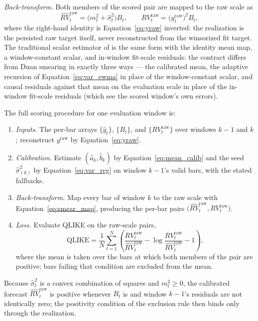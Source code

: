 \emph{Back-transform.} Both members of the scored pair are mapped to the
raw scale as
\begin{equation}
    \widehat{RV}_t^{\mathrm{raw}}
    = \bigl(m_t^2 + \hat{\sigma}^2_t\bigr) B_t,
    \qquad
    RV_t^{\mathrm{raw}} = \bigl(y^{\mathrm{raw}}_t\bigr)^2 B_t,
    \label{eq:smear_map}
\end{equation}
where the right-hand identity is Equation~\eqref{eq:yraw} inverted: the
realization is the persisted raw target itself, never reconstructed from
the winsorized fit target. The traditional scalar estimator of
\citet{Duan1983} is the same form with the identity mean map, a
window-constant scalar, and in-window fit-scale residuals: the contract
differs from Duan smearing in exactly three ways --- the calibrated
mean, the adaptive recursion of Equation~\eqref{eq:var_ewma} in place
of the window-constant scalar, and causal residuals against that mean
on the evaluation scale in place of the in-window fit-scale residuals
(which see the scored window's own errors).

The full scoring procedure for one evaluation window is:
\begin{enumerate}
    \item \emph{Inputs.} The per-bar arrays $\{\hat{y}_t\}$, $\{B_t\}$,
    and $\{RV^{\mathrm{raw}}_t\}$ over windows $k-1$ and $k$; reconstruct
    $y^{\mathrm{raw}}$ by Equation~\eqref{eq:yraw}.
    \item \emph{Calibration.} Estimate $(\hat{a}_k, \hat{b}_k)$ by
    Equation~\eqref{eq:mean_calib} and the seed $\hat{\sigma}^2_{(k)}$ by
    Equation~\eqref{eq:var_reg} on window $k-1$'s valid bars, with the
    stated fallbacks.
    \item \emph{Back-transform.} Map every bar of window $k$ to the raw
    scale with Equation~\eqref{eq:smear_map}, producing the per-bar pairs
    $\bigl(\widehat{RV}_t^{\mathrm{raw}}, RV_t^{\mathrm{raw}}\bigr)$.
    \item \emph{Loss.} Evaluate QLIKE on the raw-scale pairs,
    \begin{equation}
        \mathrm{QLIKE}
        = \frac{1}{N}\sum_{t=1}^{N}
          \left(
            \frac{RV_t^{\mathrm{raw}}}{\widehat{RV}_t^{\mathrm{raw}}}
            - \log\frac{RV_t^{\mathrm{raw}}}{\widehat{RV}_t^{\mathrm{raw}}}
            - 1
          \right),
        \label{eq:qlike_raw}
    \end{equation}
    where the mean is taken over the bars at which both members of the pair
    are positive; bars failing that condition are excluded from the mean.
\end{enumerate}
Because $\hat{\sigma}^2_t$ is a convex combination of squares and
$m_t^2 \ge 0$, the
calibrated forecast $\widehat{RV}_t^{\mathrm{raw}}$ is positive whenever
$B_t$ is and window $k-1$'s residuals are not identically zero; the
positivity condition of the exclusion rule then binds only through the
realization.

